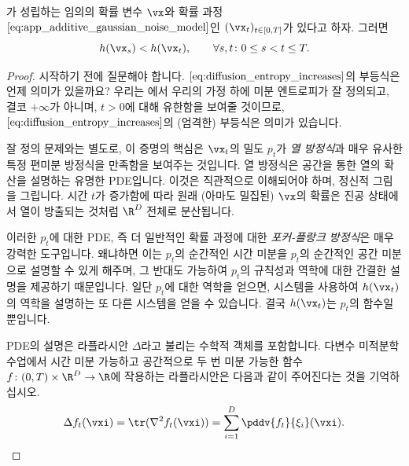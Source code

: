 \documentclass[../../book-main_ko.tex]{subfiles}
\begin{document}
\begin{theorem}\label{thm:diffusion_entropy_increases}
    가 성립하는 임의의 확률 변수 \(\vx\)와 확률 과정 \(\eqref{eq:app_additive_gaussian_noise_model}\)인 \((\vx_{t})_{t \in [0, T]}\)가 있다고 하자. 그러면 
    \begin{equation}\label{eq:diffusion_entropy_increases}
        h(\vx_{s}) < h(\vx_{t}), \qquad \forall s, t \colon 0 \leq s < t \leq T.
    \end{equation}
\end{theorem}
\begin{proof}
    시작하기 전에 질문해야 합니다. \(\eqref{eq:diffusion_entropy_increases}\)의 부등식은 언제 의미가 있을까요? 우리는 에서 우리의 가정 하에 미분 엔트로피가 잘 정의되고, 결코 \(+\infty\)가 아니며, \(t > 0\)에 대해 유한함을 보여줄 것이므로, \(\eqref{eq:diffusion_entropy_increases}\)의 (엄격한) 부등식은 의미가 있습니다.

    잘 정의 문제와는 별도로, 이 증명의 핵심은 \(\vx_{t}\)의 밀도 \(p_{t}\)가 \textit{열 방정식}과 매우 유사한 특정 편미분 방정식을 만족함을 보여주는 것입니다. 열 방정식은 공간을 통한 열의 확산을 설명하는 유명한 PDE입니다. 이것은 직관적으로 이해되어야 하며, 정신적 그림을 그립니다. 시간 \(t\)가 증가함에 따라 원래 (아마도 밀집된) \(\vx\)의 확률은 진공 상태에서 열이 방출되는 것처럼 \(\R^{D}\) 전체로 분산됩니다. 
    
    이러한 \(p_{t}\)에 대한 PDE, 즉 더 일반적인 확률 과정에 대한 \textit{포커-플랑크 방정식}은 매우 강력한 도구입니다. 왜냐하면 이는 \(p_{t}\)의 순간적인 시간 미분을 \(p_{t}\)의 순간적인 공간 미분으로 설명할 수 있게 해주며, 그 반대도 가능하여 \(p_{t}\)의 규칙성과 역학에 대한 간결한 설명을 제공하기 때문입니다. 일단 \(p_{t}\)에 대한 역학을 얻으면, 시스템을 사용하여 \(h(\vx_{t})\)의 역학을 설명하는 또 다른 시스템을 얻을 수 있습니다. 결국 \(h(\vx_{t})\)는 \(p_{t}\)의 함수일 뿐입니다.  

    PDE의 설명은 라플라시안 \(\Delta\)라고 불리는 수학적 객체를 포함합니다. 다변수 미적분학 수업에서 시간 미분 가능하고 공간적으로 두 번 미분 가능한 함수 \(f \colon (0, T) \times \R^{D} \to \R\)에 작용하는 라플라시안은 다음과 같이 주어진다는 것을 기억하십시오.
    \begin{equation}
        \Delta f_{t}(\vxi) = \tr(\nabla^{2}f_{t}(\vxi)) = \sum_{i = 1}^{D}\pddv{f_{t}}{\xi_{i}}(\vxi).
    \end{equation}
    

\end{proof}
\end{document}
